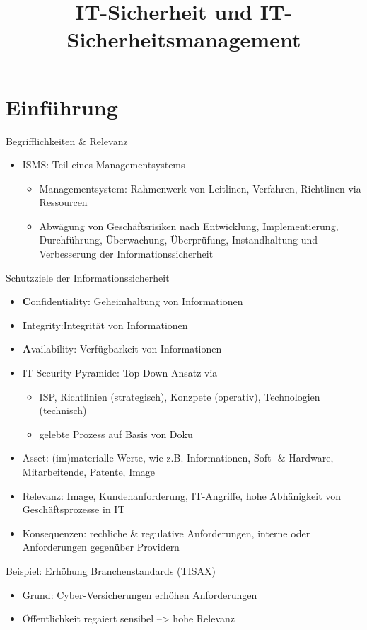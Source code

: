 \documentclass{cheatsheet}
\title{IT-Sicherheit und IT-Sicherheitsmanagement}
\begin{document}
    \section{Einführung}
    \begin{sectionbox}{Begrifflichkeiten \& Relevanz}
        \begin{itemize}
            \item ISMS: Teil eines Managementsystems
            \begin{itemize}
                \item Managementsystem: Rahmenwerk von Leitlinen, Verfahren, Richtlinen via Ressourcen
                \item Abwägung von Geschäftsrisiken nach Entwicklung, Implementierung, Durchführung, Überwachung, Überprüfung, Instandhaltung und Verbesserung der Informationssicherheit
            \end{itemize}
        \end{itemize}
        \begin{warningbox}{Schutzziele der Informationssicherheit}
            \begin{itemize}
                \item \textbf{C}onfidentiality: Geheimhaltung von Informationen
                \item \textbf{I}ntegrity:Integrität von Informationen
                \item \textbf{A}vailability: Verfügbarkeit von Informationen
            \end{itemize}
        \end{warningbox}
        \begin{itemize}   
            \item IT-Security-Pyramide: Top-Down-Ansatz via 
            \begin{itemize}
                \item ISP, Richtlinien (strategisch), Konzpete (operativ), Technologien (technisch)
                \item gelebte Prozess auf Basis von Doku
            \end{itemize}
            \item Asset: (im)materialle Werte, wie z.B. Informationen, Soft- \& Hardware, Mitarbeitende, Patente, Image
            \item Relevanz: Image, Kundenanforderung, IT-Angriffe, hohe Abhänigkeit von Geschäftsprozesse in IT
            \item Konsequenzen: rechliche \& regulative Anforderungen, interne oder Anforderungen gegenüber Providern
        \end{itemize}
        \begin{hintbox}{Beispiel: Erhöhung Branchenstandards (TISAX)}
            \begin{itemize}
                \item Grund: Cyber-Versicherungen erhöhen Anforderungen
                \item Öffentlichkeit regaiert sensibel --> hohe Relevanz 
            \end{itemize}
        \end{hintbox}
    \end{sectionbox}
\end{document}
